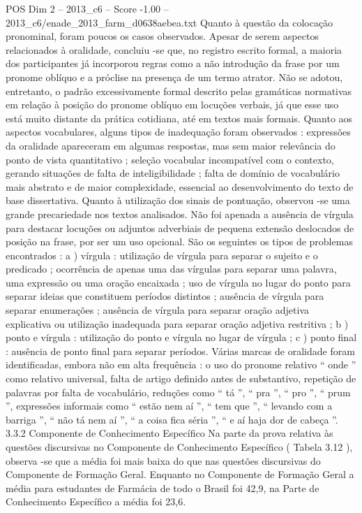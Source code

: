 \begin{textsample}{POS Dim 2 – 2013\_c6 – Score -1.00 – 2013\_c6/enade\_2013\_farm\_d0638aebea.txt}
Quanto à questão da colocação pronominal, foram poucos os casos observados.
Apesar de serem aspectos relacionados à oralidade, concluiu -se que, no registro escrito formal, a maioria dos participantes já incorporou regras como a não introdução da frase por um pronome oblíquo e a próclise na presença de um termo atrator.
Não se adotou, entretanto, o padrão excessivamente formal descrito pelas gramáticas normativas em relação à posição do pronome oblíquo em locuções verbais, já que esse uso está muito distante da prática cotidiana, até em textos mais formais.
Quanto aos aspectos vocabulares, alguns tipos de inadequação foram observados : expressões da oralidade apareceram em algumas respostas, mas sem maior relevância do ponto de vista quantitativo ; seleção vocabular incompatível com o contexto, gerando situações de falta de inteligibilidade ; falta de domínio de vocabulário mais abstrato e de maior complexidade, essencial ao desenvolvimento do texto de base dissertativa.
Quanto à utilização dos sinais de pontuação, observou -se uma grande precariedade nos textos analisados.
Não foi apenada a ausência de vírgula para destacar locuções ou adjuntos adverbiais de pequena extensão deslocados de posição na frase, por ser um uso opcional.
São os seguintes os tipos de problemas encontrados : a ) vírgula : utilização de vírgula para separar o sujeito e o predicado ; ocorrência de apenas uma das vírgulas para separar uma palavra, uma expressão ou uma oração encaixada ; uso de vírgula no lugar do ponto para separar ideias que constituem períodos distintos ; ausência de vírgula para separar enumerações ; ausência de vírgula para separar oração adjetiva explicativa ou utilização inadequada para separar oração adjetiva restritiva ; b ) ponto e vírgula : utilização do ponto e vírgula no lugar de vírgula ; c ) ponto final : ausência de ponto final para separar períodos.
Várias marcas de oralidade foram identificadas, embora não em alta frequência : o uso do pronome relativo “ onde ” como relativo universal, falta de artigo definido antes de substantivo, repetição de palavras por falta de vocabulário, reduções como “ tá ”, “ pra ”, “ pro ”, “ prum ”, expressões informais como “ estão nem aí ”, “ tem que ”, “ levando com a barriga ”, “ não tá nem aí ”, “ a coisa fica séria ”, “ e aí haja dor de cabeça ”. 3.3.2 Componente de Conhecimento Específico Na parte da prova relativa às questões discursivas no Componente de Conhecimento Específico ( Tabela 3.12 ), observa -se que a média foi mais baixa do que nas questões discursivas do Componente de Formação Geral.
Enquanto no Componente de Formação Geral a média para estudantes de Farmácia de todo o Brasil foi 42,9, na Parte de Conhecimento Específico a média foi 23,6.

\end{textsample}
